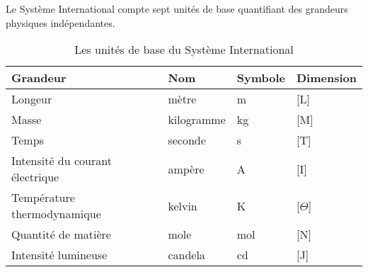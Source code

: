 Le Système International compte sept unités de base quantifiant des grandeurs 
physiques indépendantes.
\begin{table}[!h]
    \centering
    \begin{tabular}{@{}P{6cm}P{2.5cm}P{2.5cm}P{2.5cm}@{}}
        \toprule
        Grandeur & Nom & Symbole & Dimension \\
        \midrule
        Longeur & mètre & \si{\meter} & [L] \\
        Masse & kilogramme & \si{\kilogram} & [M] \\
        Temps & seconde & \si{\second} & [T] \\
        Intensité du courant électrique & ampère & \si{\ampere} & [I] \\
        Température thermodynamique & kelvin & \si{\kelvin} & [$\Theta$] \\
        Quantité de matière & mole & \si{\mole} & [N] \\
        Intensité lumineuse & candela & \si{\candela} & [J] \\
        \bottomrule
    \end{tabular}
    \caption{Les unités de base du Système International}
\end{table}
